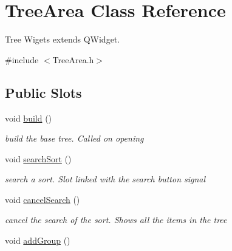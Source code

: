 \hypertarget{class_tree_area}{\section{\-Tree\-Area \-Class \-Reference}
\label{class_tree_area}
}


\-Tree \-Wigets extends \-Q\-Widget.  




{\ttfamily \#include $<$\-Tree\-Area.\-h$>$}

\subsection*{\-Public \-Slots}
\begin{DoxyCompactItemize}
\item 
\hypertarget{class_tree_area_a8fd7c22b1c8c4e8cb9503731d66c5d47}{void \hyperlink{class_tree_area_a8fd7c22b1c8c4e8cb9503731d66c5d47}{build} ()}\label{class_tree_area_a8fd7c22b1c8c4e8cb9503731d66c5d47}

\begin{DoxyCompactList}\small\item\em build the base tree. \-Called on opening \end{DoxyCompactList}\item 
\hypertarget{class_tree_area_aee1ca64b79821f9cbcc023861e169e33}{void \hyperlink{class_tree_area_aee1ca64b79821f9cbcc023861e169e33}{search\-Sort} ()}\label{class_tree_area_aee1ca64b79821f9cbcc023861e169e33}

\begin{DoxyCompactList}\small\item\em search a sort. \-Slot linked with the search button signal \end{DoxyCompactList}\item 
\hypertarget{class_tree_area_a4dc4bffd318bcf5a4023ec92a4932214}{void \hyperlink{class_tree_area_a4dc4bffd318bcf5a4023ec92a4932214}{cancel\-Search} ()}\label{class_tree_area_a4dc4bffd318bcf5a4023ec92a4932214}

\begin{DoxyCompactList}\small\item\em cancel the search of the sort. \-Shows all the items in the tree \end{DoxyCompactList}\item 
\hypertarget{class_tree_area_a1825d29fa6bd5fbf4e8c0a4f657284bd}{void \hyperlink{class_tree_area_a1825d29fa6bd5fbf4e8c0a4f657284bd}{add\-Group} ()}\label{class_tree_area_a1825d29fa6bd5fbf4e8c0a4f657284bd}


\end{DoxyCompactItemize}
